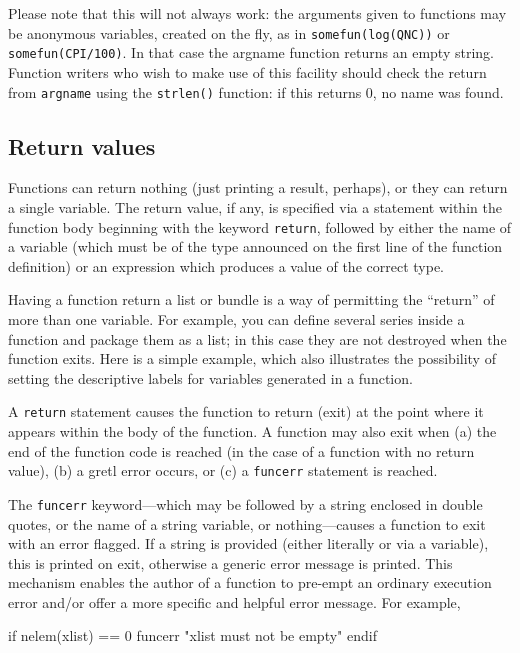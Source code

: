 Please note that this will not always work: the arguments given
to functions may be anonymous variables, created on the fly, as in
\texttt{somefun(log(QNC))} or \texttt{somefun(CPI/100)}.  In that case
the \textsf{argname} function returns an empty string.  Function
writers who wish to make use of this facility should check the return
from \texttt{argname} using the \texttt{strlen()} function: if this
returns 0, no name was found.

\subsection{Return values}

Functions can return nothing (just printing a result, perhaps), or
they can return a single variable.  The return value, if any, is
specified via a statement within the function body beginning with the
keyword \texttt{return}, followed by either the name of a variable
(which must be of the type announced on the first line of the function
definition) or an expression which produces a value of the correct
type.

Having a function return a list or bundle is a way of permitting the
``return'' of more than one variable.  For example, you can define
several series inside a function and package them as a list; in this
case they are not destroyed when the function exits.  Here is a simple
example, which also illustrates the possibility of setting the
descriptive labels for variables generated in a function.
%    

A \texttt{return} statement causes the function to return (exit) at
the point where it appears within the body of the function.  A
function may also exit when (a) the end of the function code is
reached (in the case of a function with no return value), (b) a
gretl error occurs, or (c) a \verb+funcerr+ statement is
reached.

The \verb+funcerr+ keyword---which may be followed by a string
enclosed in double quotes, or the name of a string variable, or
nothing---causes a function to exit with an error flagged.  If a
string is provided (either literally or via a variable), this is
printed on exit, otherwise a generic error message is printed.  This
mechanism enables the author of a function to pre-empt an ordinary
execution error and/or offer a more specific and helpful error
message.  For example,
%
\begin{code}
if nelem(xlist) == 0
   funcerr "xlist must not be empty"
endif
\end{code}


